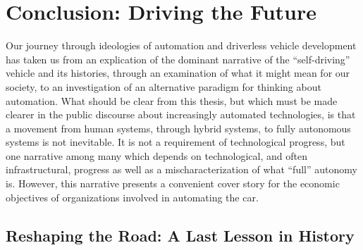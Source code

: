 \chapter{Conclusion: Driving the Future}
\label{chap:4}



Our journey through ideologies of automation and driverless vehicle
development has taken us from an explication of the dominant narrative
of the ``self-driving'' vehicle and its histories, through an examination of what it
might mean for our society, to an investigation of an alternative
paradigm for thinking about automation. What
should be clear from this thesis, but which must be made clearer in the
public discourse about increasingly automated technologies, is that a
movement from human systems, through hybrid systems, to fully
autonomous systems is not inevitable. It is not a
requirement of technological progress, but one narrative among many
which depends on technological, and often 
infrastructural, progress as well as a mischaracterization of what
``full'' autonomy is. However, this narrative
presents a convenient cover story for the economic objectives of
organizations involved in automating the car.

\section{Reshaping the Road: A Last Lesson in History}



